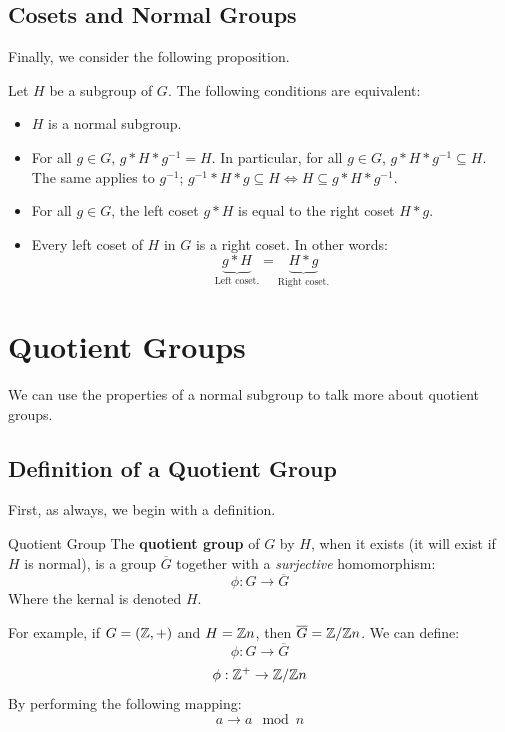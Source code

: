 \documentclass[letterpaper]{article}
\begin{document}
\subsection{Cosets and Normal Groups}
Finally, we consider the following proposition.
\begin{proposition}
    Let $H$ be a subgroup of $G$. The following conditions are equivalent: 
    \begin{itemize}
        \item $H$ is a normal subgroup. 
        \item For all $g \in G$, $g * H * g^{-1} = H$. In particular, for all $g \in G$, $g * H * g^{-1} \subseteq H$. The same applies to $g^{-1}$; $g^{-1} * H * g \subseteq H \iff H \subseteq g * H * g^{-1}$. 
        \item For all $g \in G$, the left coset $g * H$ is equal to the right coset $H * g$. 
        \item Every left coset of $H$ in $G$ is a right coset. In other words:
        \[\underbrace{g * H}_{\text{Left coset.}} = \underbrace{H * g}_{\text{Right coset.}}\] 
    \end{itemize}
\end{proposition}
 











\newpage 
\section{Quotient Groups}
We can use the properties of a normal subgroup to talk more about quotient groups. 

\subsection{Definition of a Quotient Group}
First, as always, we begin with a definition. 
\begin{definition}{Quotient Group}{}
    The \textbf{quotient group} of $G$ by $H$, when it exists (it will exist if $H$ is normal), is a group $\overline{G}$ together with a \emph{surjective} homomorphism: 
    \[\phi: G \to \overline{G}\]
    Where the kernal is denoted $H$. 
\end{definition}
For example, if $G = (\mathbb{Z}, +)$ and $H = \mathbb{Z} n$, then $\overline{G} = \mathbb{Z} / \mathbb{Z} n$. We can define: 
\[\phi: G \to \overline{G}\]
\[\phi: \mathbb{Z}^+ \to \mathbb{Z} / \mathbb{Z} n\]
By performing the following mapping: 
\[a \to a \mod{n}\]
\end{document}
